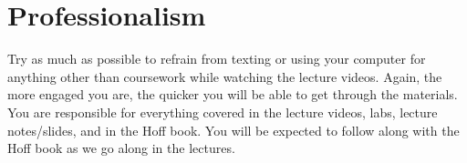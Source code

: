 \documentclass[11pt, a4paper]{article}
\begin{document}
\section{Professionalism}
Try as much as possible to refrain from texting or using your computer for anything other than coursework while watching the lecture videos. Again, the more engaged you are, the quicker you will be able to get through the materials. You are responsible for everything covered in the lecture videos, labs, lecture notes/slides, and in the Hoff book. You will be expected to follow along with the Hoff book as we go along in the lectures.
\end{document}
